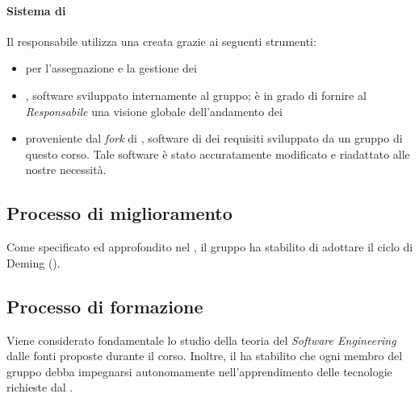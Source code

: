 \paragraph*{Sistema di }Il responsabile utilizza una  creata grazie ai seguenti strumenti:
\begin{itemize}

\item {} per l'assegnazione e la gestione dei 
\item {}, software sviluppato internamente al gruppo; è in grado di fornire al \textit{Responsabile} una visione globale dell'andamento dei 
\item {}  proveniente dal \textit{fork} di , software di  dei requisiti sviluppato da un gruppo di questo corso. Tale software è stato accuratamente modificato e riadattato alle nostre necessità.
\end{itemize}

\subsection{Processo di miglioramento}

Come specificato ed approfondito nel \PianoDiQualifica, il gruppo ha stabilito di adottare il ciclo di Deming ().

\subsection{Processo di formazione}

Viene considerato fondamentale lo studio della teoria del \textit{Software Engineering} dalle fonti proposte durante il corso.
Inoltre, il  ha stabilito che ogni membro del gruppo debba impegnarsi autonomamente nell'apprendimento delle tecnologie richieste dal .
